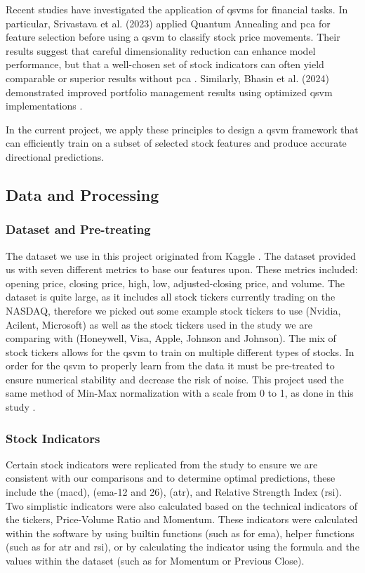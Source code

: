 \documentclass{article}
\begin{document}
Recent studies have investigated the application of \gls{qsvm}s for financial tasks. In particular, Srivastava et al. (2023) applied Quantum Annealing and \gls{pca} for feature selection before using a \gls{qsvm} to classify stock price movements. Their results suggest that careful dimensionality reduction can enhance model performance, but that a well-chosen set of stock indicators can often yield comparable or superior results without \gls{pca} \cite{srivastava2023}. Similarly, Bhasin et al. (2024) demonstrated improved portfolio management results using optimized \gls{qsvm} implementations \cite{bhasin2024}.

In the current project, we apply these principles to design a \gls{qsvm} framework that can efficiently train on a subset of selected stock features and produce accurate directional predictions.

\subsection{Data and Processing}
\subsubsection{Dataset and Pre-treating}
The dataset we use in this project originated from Kaggle \cite{onyshchak2020}. The dataset provided us with seven different metrics to base our features upon. These metrics included: opening price, closing price, high, low, adjusted-closing price, and volume. The dataset is quite large, as it includes all stock tickers currently trading on the NASDAQ, therefore we picked out some example stock tickers to use (Nvidia, Acilent, Microsoft) as well as the stock tickers used in the study we are comparing with (Honeywell, Visa, Apple, Johnson and Johnson). The mix of stock tickers allows for the \gls{qsvm} to train on multiple different types of stocks. In order for the \gls{qsvm} to properly learn from the data it must be pre-treated to ensure numerical stability and decrease the risk of noise. This project used the same method of Min-Max normalization with a scale from 0 to 1, as done in this study \cite{bhasin2024}. 
\subsubsection{Stock Indicators}
Certain stock indicators were replicated from the study to ensure we are consistent with our comparisons and to determine optimal predictions, these include the (\gls{macd}), (\gls{ema}-12 and 26), (\gls{atr}), and Relative Strength Index (\gls{rsi}). Two simplistic indicators were also calculated based on the technical indicators of the tickers, Price-Volume Ratio and Momentum. These indicators were calculated within the software by using builtin functions (such as for \gls{ema}), helper functions (such as for \gls{atr} and \gls{rsi}), or by calculating the indicator using the formula and the values within the dataset (such as for Momentum or Previous Close).
\newpage   
\end{document}

